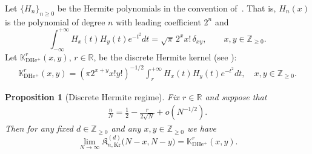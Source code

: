 \documentclass[reqno,11pt]{amsart}
\newcommand{\ZZ}{\mathbb{Z}}
\newcommand{\RR}{\mathbb{R}}
\theoremstyle{plain}
\newtheorem{prop}[thm]{Proposition}
\theoremstyle{definition}
\numberwithin{equation}{section}
\begin{document}
Let $\{H_n\}_{n\geq 0}$ be the Hermite polynomials in the convention of~\cite[\S9.15]{Koekoek}. That is, $H_n(x)$ is the polynomial of degree $n$ with leading coefficient $2^n$ and  
$$
\int_{-\infty}^{+\infty} H_x(t)H_y(t)e^{-t^2}dt =
\sqrt{\pi}\, 2^{x}x!\,\delta_{xy}, \qquad x,y\in\ZZ_{\ge0}.
$$
Let $\mathbb K_{\mathrm{DHe^{+}}}^r(x,y)$, $r\in\RR$,  be the discrete Hermite kernel
(see \cite{Borodin_2017}):
\begin{align*}
\mathbb K_{\mathrm{DHe^{+}}}^r(x,y)=(\pi 2^{x+y}x!y!)^{-1/2}\int_{r}^{+\infty} H_x(t)H_y(t)e^{-t^2}dt, \quad x,y\in\ZZ_{\ge0}.
\end{align*}
\begin{prop}[Discrete Hermite regime]\label{prop:kr_discr-Hermite}
 Fix $r\in \mathbb{R}$ and suppose that
\begin{align*}
	 \frac{n}{N}=\frac{1}{2}-\frac{r}{2\sqrt{N}}+o(N^{-1/2}).
	 \end{align*}
Then for any fixed $d\in\ZZ_{\ge0}$ and
any $x,y\in\ZZ_{\ge0}$ we have
\[
\lim_{N\to\infty}
\mathfrak K_{n,\mathrm{Kr}}^{(d)}
\bigl(N-x,N-y\bigr)
=
\mathbb K_{\mathrm{DHe^{+}}}^{r}(x,y).
\]
\end{prop}
\end{document}
